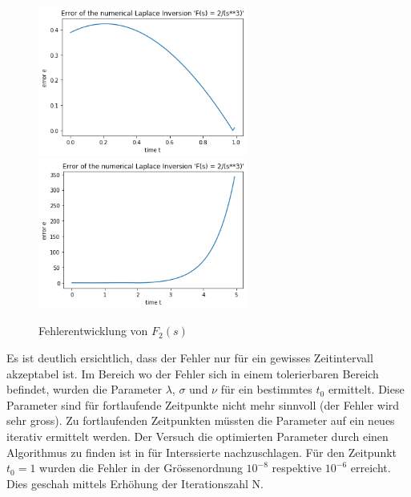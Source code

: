 
\begin{figure}
\centering
\includegraphics[width=6.9cm]{papers/laplace/Error_2divide_s_pow3}
\includegraphics[width=6.9cm]{papers/laplace/Error_2divide_s_pow3_bis_tgleich5}
\caption{Fehlerentwicklung von $F_{2}(s)$
\label{laplace:fehlerf2}
}
\end{figure}



Es ist deutlich ersichtlich, dass der Fehler nur für ein gewisses
Zeitintervall akzeptabel ist. Im Bereich wo der Fehler sich in einem
tolerierbaren Bereich befindet, wurden die Parameter $\lambda$,
$\sigma$ und $\nu$ für ein bestimmtes $t_{0}$ ermittelt.
Diese Parameter sind für fortlaufende Zeitpunkte nicht mehr sinnvoll (der Fehler wird sehr gross). Zu fortlaufenden Zeitpunkten müssten die Parameter auf ein neues iterativ ermittelt werden. Der Versuch die optimierten Parameter durch einen Algorithmus zu finden ist in \cite{laplace:talbot} für Interssierte nachzuschlagen. 
Für den Zeitpunkt $t_{0}=1$ wurden die Fehler in der Grössenordnung $10^{-8}$ respektive $10^{-6}$ erreicht. 
Dies geschah mittels Erhöhung der Iterationszahl N.

